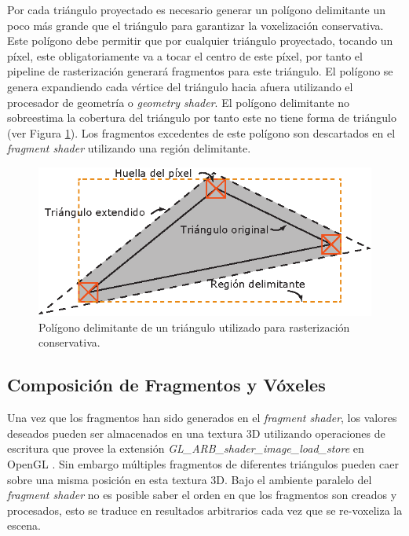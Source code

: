 Por cada triángulo proyectado es necesario generar un polígono delimitante un poco más grande que el triángulo para garantizar la voxelización conservativa. Este polígono debe permitir que por cualquier triángulo proyectado, tocando un píxel, este obligatoriamente va a tocar el centro de este píxel, por tanto el pipeline de rasterización generará fragmentos para este triángulo. El polígono se genera expandiendo cada vértice del triángulo hacia afuera utilizando el procesador de geometría o \emph{geometry shader}. El polígono delimitante no sobreestima la cobertura del triángulo por tanto este no tiene forma de triángulo (ver Figura \ref{fig:expanded_bbpolygon}). Los fragmentos excedentes de este polígono son descartados en el \emph{fragment shader} utilizando una región delimitante.

\begin{figure}[H]
	\centering
	\captionsetup{justification=centering}
	\includegraphics[width=0.7\linewidth]{media/conservative_triangle.eps}
	\caption{Polígono delimitante de un triángulo utilizado para rasterización conservativa.}
	\label{fig:expanded_bbpolygon}
\end{figure}


\subsection{Composición de Fragmentos y Vóxeles}
\label{sub:frag_voxels}
Una vez que los fragmentos han sido generados en el \emph{fragment shader}, los valores deseados pueden ser almacenados en una textura 3D utilizando operaciones de escritura que provee la extensión \emph{GL\_ARB\_shader\_image\_load\_store} en OpenGL \cite{ImageLoadStore}. Sin embargo múltiples fragmentos de diferentes triángulos pueden caer sobre una misma posición en esta textura 3D. Bajo el ambiente paralelo del \emph{fragment shader} no es posible saber el orden en que los fragmentos son creados y procesados, esto se traduce en resultados arbitrarios cada vez que se re-voxeliza la escena.

